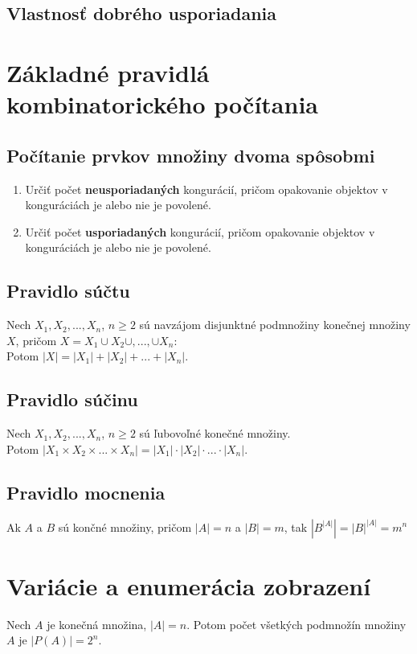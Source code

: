 	\subsection{Vlastnosť dobrého usporiadania}

\section {Základné pravidlá kombinatorického počítania}
	\subsection{Počítanie prvkov množiny dvoma spôsobmi}
		\begin{enumerate}
			\item Určiť počet \textbf{neusporiadaných} kongurácií, pričom opakovanie objektov v konguráciách je alebo nie je povolené.
			\item Určiť počet \textbf{usporiadaných} kongurácií, pričom opakovanie objektov v konguráciách je alebo nie je povolené.
		\end{enumerate}
	\subsection{Pravidlo súčtu}
		Nech $X_{1}, X_{2}, ...,  X_{n}$, $n \geq 2$ sú navzájom disjunktné podmnožiny konečnej množiny $X$, pričom $X = X_{1} \cup X_{2} \cup , ..., \cup X_{n}$: \\
		Potom $|X| = |X_{1}| + |X_{2}| + ... + |X_{n}|$.
	\subsection{Pravidlo súčinu}
		Nech $X_{1}, X_{2}, ...,  X_{n}$, $n \geq 2$ sú ľubovoľné konečné množiny.\\
		Potom $|X_{1} \times X_{2} \times ... \times X_{n}| = |X_{1}| \cdot |X_{2}| \cdot ... \cdot |X_{n}|$.

	\subsection{Pravidlo mocnenia}
		Ak $A$ a $B$ sú končné množiny, pričom $|A| = n$ a $|B| = m$, tak $|B^{|A|}| = |B|^{|A|} = m^{n}$

\section {Variácie a enumerácia zobrazení}
	Nech $A$ je konečná množina, $|A| = n$. Potom počet všetkých podmnožín množiny $A$ je $|P(A)| = 2^{n}$.

